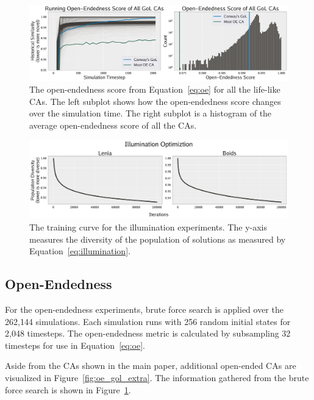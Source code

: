\documentclass{article}
\begin{document}
\begin{figure}[th!]
    \centering
    \includegraphics[width=1.0\linewidth]{figs/oe_gol_learning_curve-min.png}
    \caption{The open-endedness score from Equation~\ref{eq:oe} for all the life-like CAs.
    The left subplot shows how the open-endedness score changes over the simulation time.
    The right subplot is a histogram of the average open-endedness score of all the CAs.}
    \label{fig:oe_gol_learning_curve}
\end{figure}
\begin{figure}[th!]
    \centering
    \includegraphics[width=1.0\linewidth]{figs/illumination_learning_curve_compressed.pdf}
    \caption{The training curve for the illumination experiments.
    The y-axis measures the diversity of the population of solutions as measured by Equation~\ref{eq:illumination}.
    }
    \label{fig:illumination_learning_curve}
\end{figure}


\subsection{Open-Endedness}

For the open-endedness experiments, brute force search is applied over the 262,144 simulations.
Each simulation runs with 256 random initial states for 2,048 timesteps.
The open-endedness metric is calculated by subsampling 32 timesteps for use in Equation~\ref{eq:oe}.

Aside from the CAs shown in the main paper, additional open-ended CAs are visualized in Figure~\ref{fig:oe_gol_extra}.
The information gathered from the brute force search is shown in Figure~\ref{fig:oe_gol_learning_curve}.
\end{document}
